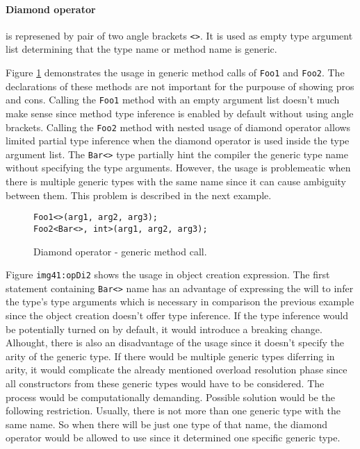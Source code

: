 \paragraph*{Diamond operator} is represened by pair of two angle brackets \texttt{<>}.
It is used as empty type argument list determining that the type name or method name is generic.
\par
Figure \ref{img40:opDi1} demonstrates the usage in generic method calls of \texttt{Foo1} and \texttt{Foo2}.
The declarations of these methods are not important for the purpouse of showing pros and cons.
Calling the \texttt{Foo1} method with an empty argument list doesn't much make sense since method type inference is enabled by default without using angle brackets.
Calling the \texttt{Foo2} method with nested usage of diamond operator allows limited partial type inference when the diamond operator is used inside the type argument list.
The \texttt{Bar<>} type partially hint the compiler the generic type name without specifying the type arguments.
However, the usage is problemeatic when there is multiple generic types with the same name since it can cause ambiguity between them.
This problem is described in the next example.
\begin{figure}[h]
\begin{lstlisting}[style=csharp]
Foo1<>(arg1, arg2, arg3);
Foo2<Bar<>, int>(arg1, arg2, arg3);
\end{lstlisting}
\caption{Diamond operator - generic method call.}
\label{img40:opDi1}
\end{figure}
\par
Figure \texttt{img41:opDi2} shows the usage in object creation expression.
The first statement containing \texttt{Bar<>} name has an advantage of expressing the will to infer the type's type arguments which is necessary in comparison the previous example since the object creation doesn't offer type inference.
If the type inference would be potentially turned on by default, it would introduce a breaking change.
Alhought, there is also an disadvantage of the usage since it doesn't specify the arity of the generic type.
If there would be multiple generic types diferring in arity, it would complicate the already mentioned overload resolution phase since all constructors from these generic types would have to be considered.
The process would be computationally demanding.
Possible solution would be the following restriction. 
Usually, there is not more than one generic type with the same name. 
So when there will be just one type of that name, the diamond operator would be allowed to use since it determined one specific generic type.
